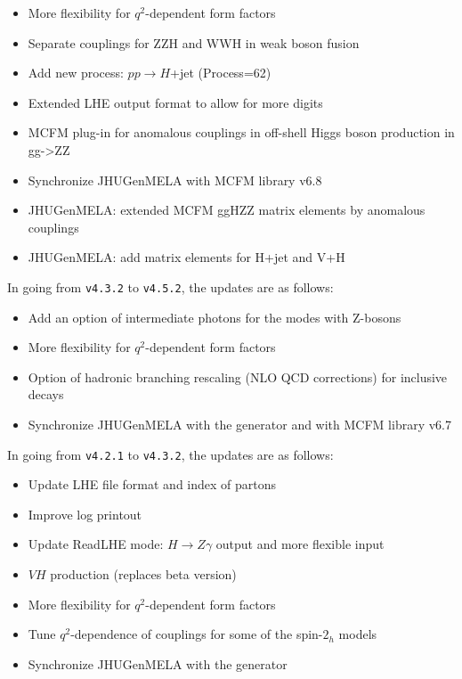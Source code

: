 \documentclass[aps,superscriptaddress,nofootinbib]{revtex4}
\begin{document}
\begin{itemize}
\item More flexibility for $q^2$-dependent form factors
\item Separate couplings for ZZH and WWH in weak boson fusion
\item Add new process: $pp\to H$+jet (Process=62)
\item Extended LHE output format to allow for more digits
\item MCFM plug-in for anomalous couplings in off-shell Higgs boson production in gg->ZZ
\item Synchronize JHUGenMELA with MCFM library v6.8
\item JHUGenMELA: extended MCFM ggHZZ matrix elements by anomalous couplings
\item JHUGenMELA: add matrix elements for H+jet and V+H
\end{itemize}


\noindent
In going from \verb|v4.3.2| to \verb|v4.5.2|, the updates are as follows:

\begin{itemize}
\item Add an option of intermediate photons for the modes with Z-bosons
\item More flexibility for $q^2$-dependent form factors
\item Option of hadronic branching rescaling (NLO QCD corrections) for inclusive decays
\item Synchronize JHUGenMELA with the generator and with MCFM library v6.7
\end{itemize}

\noindent
In going from \verb|v4.2.1| to \verb|v4.3.2|, the updates are as follows:

\begin{itemize}
\item Update LHE file format and index of partons
\item Improve log printout
\item Update ReadLHE mode: $H\to Z\gamma$ output and more flexible input
\item $VH$ production (replaces beta version)
\item More flexibility for $q^2$-dependent form factors
\item Tune $q^2$-dependence of couplings for some of the spin-$2_h$ models
\item Synchronize JHUGenMELA with the generator
\end{itemize}
\end{document}
